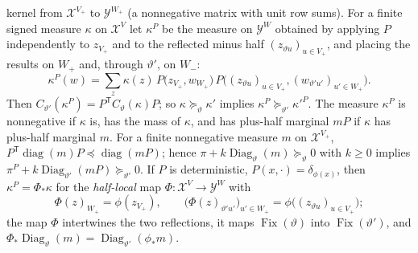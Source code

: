 \begin{lemma}
\begin{enumerate}[label=(\roman*)]
 kernel from $\mathcal X^{V_+}$ to $\mathcal Y^{W_+}$ (a nonnegative matrix with
 unit row sums). For a finite signed measure $\kappa$ on $\mathcal X^V$ let
 $\kappa^P$ be the measure on $\mathcal Y^W$ obtained by applying $P$
 independently to $z_{V_+}$ and to the reflected minus half
 $(z_{\vartheta u})_{u\in V_+}$, and placing the results on $W_+$ and, through
 $\vartheta'$, on $W_-$:
 \[
  \kappa^P(w)=\sum_{z}\kappa(z)\,P\big(z_{V_+},w_{W_+}\big)\,
  P\big((z_{\vartheta u})_{u\in V_+},(w_{\vartheta'u'})_{u'\in W_+}\big).
 \]
 Then $C_{\vartheta'}(\kappa^P)=P^{\mathsf T}C_\vartheta(\kappa)P$; so
 $\kappa\succeq_\vartheta\kappa'$ implies $\kappa^P\succeq_{\vartheta'}\kappa'^P$.
 The measure $\kappa^P$ is nonnegative if $\kappa$ is, has the mass of
 $\kappa$, and has plus-half marginal $mP$ if $\kappa$ has plus-half marginal
 $m$. For a finite nonnegative measure $m$ on $\mathcal X^{V_+}$,
 $P^{\mathsf T}\operatorname{diag}(m)P\preceq\operatorname{diag}(mP)$; hence
 $\pi+k\operatorname{Diag}_\vartheta(m)\succeq_\vartheta0$ with $k\ge0$ implies
 $\pi^P+k\operatorname{Diag}_{\vartheta'}(mP)\succeq_{\vartheta'}0$. If $P$ is
 deterministic, $P(x,\cdot)=\delta_{\phi(x)}$, then $\kappa^P=\Phi_*\kappa$ for
 the \emph{half-local} map $\Phi\colon\mathcal X^V\to\mathcal Y^W$ with
 \[
  \Phi(z)_{W_+}=\phi(z_{V_+}),\qquad
  \big(\Phi(z)_{\vartheta'u'}\big)_{u'\in W_+}=\phi\big((z_{\vartheta u})_{u\in V_+}\big);
 \]
 the map $\Phi$ intertwines the two reflections, it maps
 $\operatorname{Fix}(\vartheta)$ into $\operatorname{Fix}(\vartheta')$, and
 $\Phi_*\operatorname{Diag}_\vartheta(m)=\operatorname{Diag}_{\vartheta'}(\phi_*m)$.
\end{enumerate}
\end{lemma}


